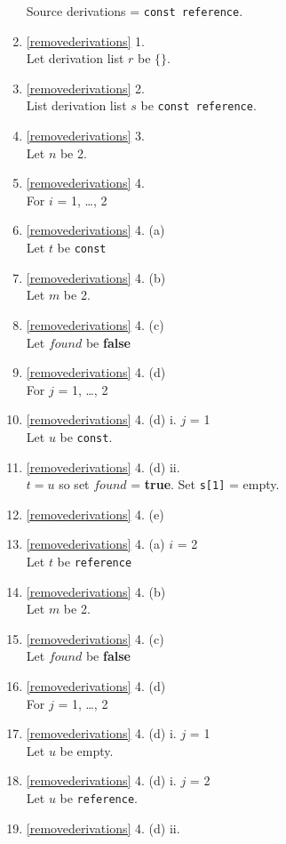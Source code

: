 \documentclass[a4paper,oneside,11pt]{book}
\theoremstyle{definition}
\begin{document}
\begin{enumerate}
Source derivations = \verb|const reference|.
\item
\ref{removederivations} 1.\\
Let derivation list $r$ be $\{\}$.
\item
\ref{removederivations} 2.\\
List derivation list $s$ be \verb|const reference|.
\item
\ref{removederivations} 3.\\
Let $n$ be 2.
\item
\ref{removederivations} 4.\\
For $i$ = 1, \ldots, 2
\item
\ref{removederivations} 4. (a)\\
Let $t$ be \verb|const|
\item
\ref{removederivations} 4. (b)\\
Let $m$ be 2.
\item
\ref{removederivations} 4. (c)\\
Let $found$ be \textbf{false}
\item
\ref{removederivations} 4. (d)\\
For $j$ = 1, \ldots, 2
\item
\ref{removederivations} 4. (d) i. $j$ = 1\\
Let $u$ be \verb|const|.
\item
\ref{removederivations} 4. (d) ii.\\
$t = u$ so set $found$ = \textbf{true}. Set \verb|s[1]| = empty.
\item
\ref{removederivations} 4. (e)\\
\item
\ref{removederivations} 4. (a) $i$ = 2\\
Let $t$ be \verb|reference|
\item
\ref{removederivations} 4. (b)\\
Let $m$ be 2.
\item
\ref{removederivations} 4. (c)\\
Let $found$ be \textbf{false}
\item
\ref{removederivations} 4. (d)\\
For $j$ = 1, \ldots, 2
\item
\ref{removederivations} 4. (d) i. $j$ = 1\\
Let $u$ be empty.
\item
\ref{removederivations} 4. (d) i. $j$ = 2\\
Let $u$ be \verb|reference|.
\item
\ref{removederivations} 4. (d) ii.\\

\end{enumerate}
\end{document}

